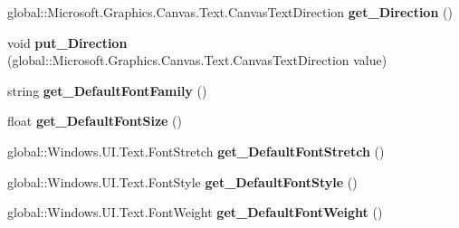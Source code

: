 \begin{DoxyCompactItemize}
\item 
\mbox{\label{class_microsoft_1_1_graphics_1_1_canvas_1_1_text_1_1_canvas_text_layout_acf787c5c52efb0a761fd5fa779c0b7a6}} 
global\+::\+Microsoft.\+Graphics.\+Canvas.\+Text.\+Canvas\+Text\+Direction {\bfseries get\+\_\+\+Direction} ()
\item 
\mbox{\label{class_microsoft_1_1_graphics_1_1_canvas_1_1_text_1_1_canvas_text_layout_a73aa648a92dd6826fcda1869c17dd35d}} 
void {\bfseries put\+\_\+\+Direction} (global\+::\+Microsoft.\+Graphics.\+Canvas.\+Text.\+Canvas\+Text\+Direction value)
\item 
\mbox{\label{class_microsoft_1_1_graphics_1_1_canvas_1_1_text_1_1_canvas_text_layout_a3b9b032aa706d4c64f518de16b2fb53d}} 
string {\bfseries get\+\_\+\+Default\+Font\+Family} ()
\item 
\mbox{\label{class_microsoft_1_1_graphics_1_1_canvas_1_1_text_1_1_canvas_text_layout_a7b61d023318daba6edb2a2a6e8d53fa4}} 
float {\bfseries get\+\_\+\+Default\+Font\+Size} ()
\item 
\mbox{\label{class_microsoft_1_1_graphics_1_1_canvas_1_1_text_1_1_canvas_text_layout_a39ba6144e9670d96a118f3b5b8933014}} 
global\+::\+Windows.\+U\+I.\+Text.\+Font\+Stretch {\bfseries get\+\_\+\+Default\+Font\+Stretch} ()
\item 
\mbox{\label{class_microsoft_1_1_graphics_1_1_canvas_1_1_text_1_1_canvas_text_layout_a027a22f4db9f7685afafe0bab3bf926b}} 
global\+::\+Windows.\+U\+I.\+Text.\+Font\+Style {\bfseries get\+\_\+\+Default\+Font\+Style} ()
\item 
\mbox{\label{class_microsoft_1_1_graphics_1_1_canvas_1_1_text_1_1_canvas_text_layout_a665d4ab9b759ce12af06a94fe2bbdcf2}} 
global\+::\+Windows.\+U\+I.\+Text.\+Font\+Weight {\bfseries get\+\_\+\+Default\+Font\+Weight} ()

\end{DoxyCompactItemize}
